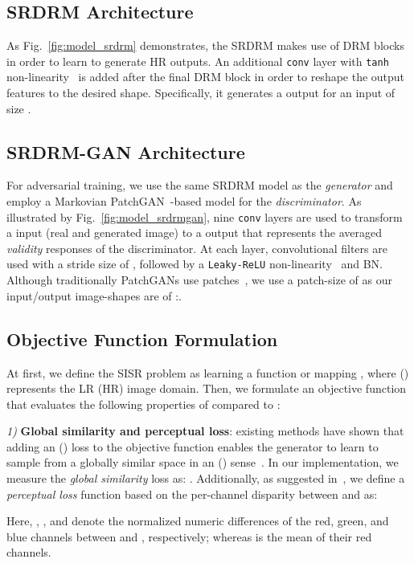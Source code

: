 \documentclass[10pt,twocolumn,letterpaper]{article}
\begin{document}
\subsection{SRDRM Architecture}
As Fig.~\ref{fig:model_srdrm} demonstrates, the SRDRM makes use of  DRM blocks in order to learn to generate  HR outputs. An additional {\tt conv} layer with {\tt tanh} non-linearity~\cite{raiko2012deep} is added after the final DRM block in order to reshape the output features to the desired shape. Specifically, it generates a  output for an input of size . 



\subsection{SRDRM-GAN Architecture}
For adversarial training, we use the same SRDRM model as the \textit{generator} and employ a Markovian PatchGAN~\cite{isola2017image}-based model for the \textit{discriminator}. 
As illustrated by Fig.~\ref{fig:model_srdrmgan}, nine {\tt conv} layers are used to transform a  input (real and generated image) to a  output that represents the averaged \textit{validity} responses of the discriminator. At each layer,  convolutional filters are used with a stride size of , followed by a {\tt Leaky-ReLU} non-linearity~\cite{maas2013rectifier} and BN. 
Although traditionally PatchGANs use  patches~\cite{isola2017image,yi2017dualgan}, we use a patch-size of  as our input/output image-shapes are of :. 


\subsection{Objective Function Formulation}
At first, we define the SISR problem as learning a function or mapping , where  () represents the LR (HR) image domain.  
Then, we formulate an objective function that evaluates the following properties of  compared to :   

 \textit{1)} \textbf{Global similarity and perceptual loss}: existing methods have shown that adding an  () loss to the objective function enables the generator to learn to sample from a globally similar space in an  () sense~\cite{isola2017image}. In our implementation, we measure the \textit{global similarity} loss as:      	. Additionally, as suggested in~\cite{compuphase}, we define a \textit{perceptual loss} function based on the per-channel disparity between  and  as:  
        
    Here, , , and  denote the normalized numeric differences of the red, green, and blue channels between  and , respectively; whereas  is the mean of their red channels.  
\end{document}

